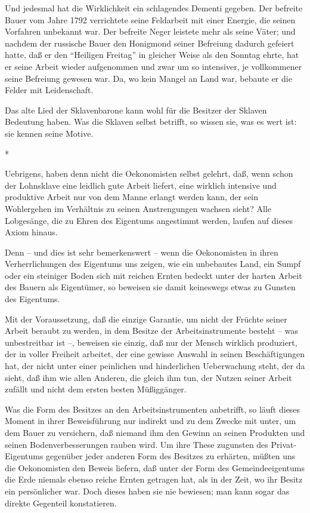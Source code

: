 \documentclass{scrbook}
\begin{document}
Und jedesmal hat die Wirklichkeit ein schlagendes Dementi gegeben. Der befreite Bauer vom Jahre 1792 verrichtete seine Feldarbeit mit einer Energie, die seinen Vorfahren unbekannt war. Der befreite Neger leistete mehr als seine Väter; und nachdem der russische Bauer den Honigmond seiner Befreiung dadurch gefeiert hatte, daß er den ``Heiligen Freitag'' in gleicher Weise als den Sonntag ehrte, hat er seine Arbeit wieder aufgenommen und zwar um so intensiver, je vollkommener seine Befreiung gewesen war. Da, wo kein Mangel an Land war, bebaute er die Felder mit Leidenschaft.

Das alte Lied der Sklavenbarone kann wohl für die Besitzer der Sklaven Bedeutung haben. Was die Sklaven selbst betrifft, so wissen sie, was es wert ist: sie kennen seine Motive.

\begin{center}*\end{center}

Uebrigens, haben denn nicht die Oekonomisten selbst gelehrt, daß, wenn schon der Lohnsklave eine leidlich gute Arbeit liefert, eine wirklich intensive und produktive Arbeit nur von dem Manne erlangt werden kann, der sein Wohlergehen im Verhältnis zu seinen Anstrengungen wachsen sieht? Alle Lobgesänge, die zu Ehren des Eigentums angestimmt werden, laufen auf dieses Axiom hinaus.

Denn – und dies ist sehr bemerkenswert – wenn die Oekonomisten in ihren Verherrlichungen des Eigentums uns zeigen, wie ein unbebautes Land, ein Sumpf oder ein steiniger Boden sich mit reichen Ernten bedeckt unter der harten Arbeit des Bauern als Eigentümer, so beweisen sie damit keineswegs etwas zu Gunsten des Eigentums.

Mit der Voraussetzung, daß die einzige Garantie, um nicht der Früchte seiner Arbeit beraubt zu werden, in dem Besitze der Arbeitsinstrumente besteht – was unbestreitbar ist –, beweisen sie einzig, daß nur der Mensch wirklich produziert, der in voller Freiheit arbeitet, der eine gewisse Auswahl in seinen Beschäftigungen hat, der nicht unter einer peinlichen und hinderlichen Ueberwachung steht, der da sieht, daß ihm wie allen Anderen, die gleich ihm tun, der Nutzen seiner Arbeit zufällt und nicht dem ersten besten Müßiggänger.

Was die Form des Besitzes an den Arbeitsinstrumenten anbetrifft, so läuft dieses Moment in ihrer Beweisführung nur indirekt und zu dem Zwecke mit unter, um dem Bauer zu versichern, daß niemand ihm den Gewinn an seinen Produkten und seinen Bodenverbesserungen rauben wird. Um ihre These zugunsten des Privat-Eigentums gegenüber jeder anderen Form des Besitzes zu erhärten, müßten uns die Oekonomisten den Beweis liefern, daß unter der Form des Gemeindeeigentums die Erde niemals ebenso reiche Ernten getragen hat, als in der Zeit, wo ihr Besitz ein persönlicher war. Doch dieses haben sie nie bewiesen; man kann sogar das direkte Gegenteil konstatieren.
\end{document}
